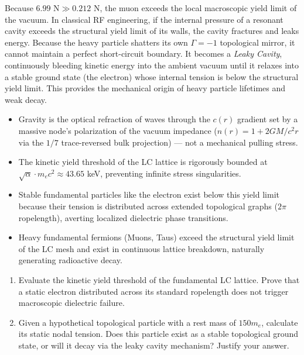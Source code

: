 Because $6.99\text{ N}\gg0.212\text{ N}$, the muon exceeds the local macroscopic yield limit of the vacuum. In classical RF engineering, if the internal pressure of a resonant cavity exceeds the structural yield limit of its walls, the cavity fractures and leaks energy. Because the heavy particle shatters its own $\Gamma=-1$\gammaundeclared{} topological mirror, it cannot maintain a perfect short-circuit boundary. It becomes a \textit{Leaky Cavity}, continuously bleeding kinetic energy into the ambient vacuum until it relaxes into a stable ground state (the electron) whose internal tension is below the structural yield limit. This provides the mechanical origin of heavy particle lifetimes and weak decay.

\begin{summarybox}
\begin{itemize}
    \item Gravity is the optical refraction of waves through the $c(r)$ gradient set by a massive node's polarization of the vacuum impedance ($n(r) = 1 + 2GM/c^2r$ via the $1/7$ trace-reversed bulk projection) --- not a mechanical pulling stress.
    \item The kinetic yield threshold of the LC lattice is rigorously bounded at $\sqrt{\alpha} \cdot m_e c^2 \approx 43.65$ keV, preventing infinite stress singularities.
    \item Stable fundamental particles like the electron exist below this yield limit because their tension is distributed across extended topological graphs ($2\pi$ ropelength), averting localized dielectric phase transitions.
    \item Heavy fundamental fermions (Muons, Taus) exceed the structural yield limit of the LC mesh and exist in continuous lattice breakdown, naturally generating radioactive decay.
\end{itemize}
\end{summarybox}

\begin{exercisebox}
\begin{enumerate}
    \item Evaluate the kinetic yield threshold of the fundamental LC lattice. Prove that a static electron distributed across its standard ropelength does not trigger macroscopic dielectric failure.
    \item Given a hypothetical topological particle with a rest mass of $150 m_e$, calculate its static nodal tension. Does this particle exist as a stable topological ground state, or will it decay via the leaky cavity mechanism? Justify your answer.
\end{enumerate}
\end{exercisebox}